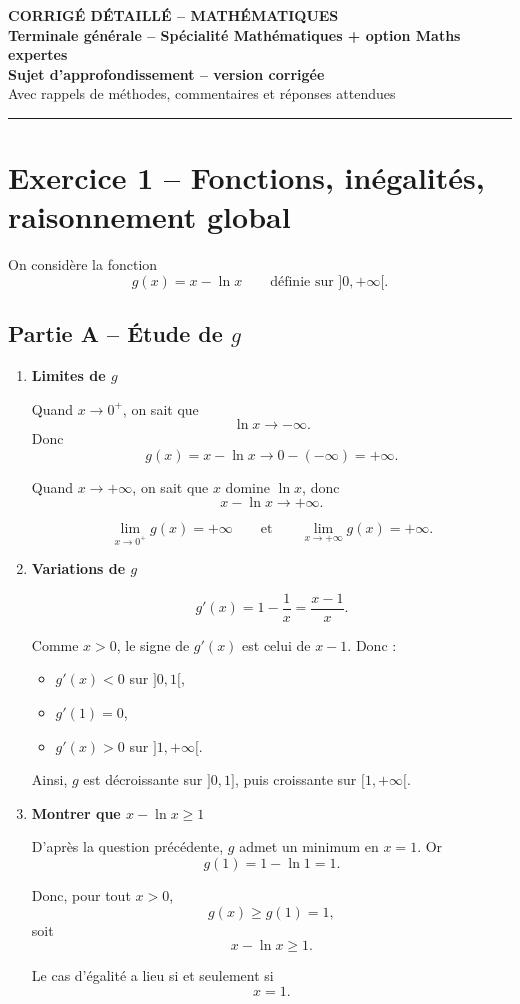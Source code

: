 \documentclass[11pt,a4paper]{article}
\begin{document}
\begin{center}
    {\Large \textbf{CORRIGÉ DÉTAILLÉ -- MATHÉMATIQUES}}\\[0.3em]
    {\large \textbf{Terminale générale -- Spécialité Mathématiques + option Maths expertes}}\\[0.4em]
    {\large \textbf{Sujet d’approfondissement -- version corrigée}}\\[0.5em]
    Avec rappels de méthodes, commentaires et réponses attendues
\end{center}

\vspace{0.5em}
\hrule
\vspace{0.6em}

\section*{Exercice 1 -- Fonctions, inégalités, raisonnement global}

On considère la fonction
\[
g(x)=x-\ln x
\qquad \text{définie sur } ]0,+\infty[.
\]

\subsection*{Partie A -- Étude de \(g\)}

\begin{enumerate}[label=\textbf{1.\arabic*}, leftmargin=1.6em]

\item \textbf{Limites de \(g\)}

Quand \(x\to 0^+\), on sait que
\[
\ln x \to -\infty.
\]
Donc
\[
g(x)=x-\ln x \to 0-(-\infty)=+\infty.
\]

Quand \(x\to +\infty\), on sait que \(x\) domine \(\ln x\), donc
\[
x-\ln x \to +\infty.
\]

\[
\boxed{\lim_{x\to 0^+} g(x)=+\infty
\qquad\text{et}\qquad
\lim_{x\to +\infty} g(x)=+\infty.}
\]

\item \textbf{Variations de \(g\)}

\[
g'(x)=1-\frac1x=\frac{x-1}{x}.
\]

Comme \(x>0\), le signe de \(g'(x)\) est celui de \(x-1\). Donc :
\begin{itemize}
    \item \(g'(x)<0\) sur \(]0,1[\),
    \item \(g'(1)=0\),
    \item \(g'(x)>0\) sur \(]1,+\infty[\).
\end{itemize}

Ainsi, \(g\) est décroissante sur \(]0,1]\), puis croissante sur \([1,+\infty[\).

\item \textbf{Montrer que \(x-\ln x\ge 1\)}

D’après la question précédente, \(g\) admet un minimum en \(x=1\). Or
\[
g(1)=1-\ln 1=1.
\]

Donc, pour tout \(x>0\),
\[
g(x)\ge g(1)=1,
\]
soit
\[
\boxed{x-\ln x\ge 1.}
\]

Le cas d’égalité a lieu si et seulement si
\[
\boxed{x=1.}
\]

\end{enumerate}
\end{document}

